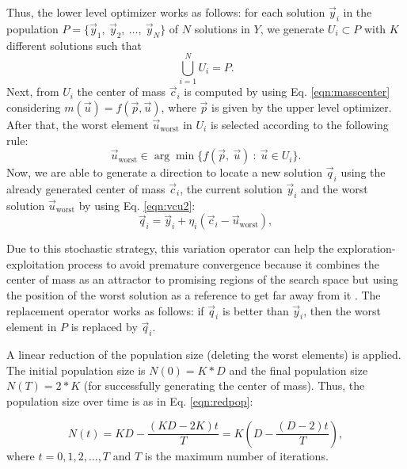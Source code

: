 \documentclass[conference]{IEEEtran}
\begin{document}
Thus, the lower level optimizer works as follows: for each solution $\vec{y}_i $
in the population $P = \{ \vec{y}_1,\ \vec{y}_2, \ \ldots, \ \vec{y}_{N} \} $
of $N$  solutions in $Y$, we generate $U_i \subset P $ with $K$ different
solutions such that
% 
$$
\bigcup_{i=1}^N U_i = P.
$$
%
Next, from $U_i$ the center of mass $\vec{c}_i$ is computed by using Eq. \ref{eqn:masscenter}
considering $m(\vec{u}) = f(\vec{p}, \vec{u})$, where $\vec{p}$ is given by the
upper level optimizer. After that, the worst element $\vec{u}_{\text{worst}}$
in $U_i$ is selected according to the following rule:
% 
$$
    \vec{u}_{\text{worst}} \in \arg \min \{f(\vec{p}, \ \vec{u} ) 
    \ : \
    \vec{u} \in U_i \}.
$$
% 
Now, we are able to generate a direction to locate a new solution $ \vec{q}_i$
using the already generated center of mass $\vec{c}_i$, the current solution
$\vec{y}_i$ and the worst solution $\vec{u}_{\text{worst}}$ by using Eq. \ref{eqn:vcu2}:
% 
\begin{equation}
    \vec{q}_i = \vec{y}_i + \eta _{i} ( \vec{c}_i - \vec{u}_{ \text{worst} } ) ,
    \label{eqn:vcu2}
\end{equation}
% 

Due to this stochastic strategy, this variation operator can help the exploration-exploitation 
process to avoid premature convergence because it combines the center of mass as
an attractor to promising regions of the search space but using the position of
the worst solution as a reference to get far away from it \cite{Mejia2018}. The
replacement operator works as follows: if $\vec{q}_i$ is better than $\vec{y}_i$,
then the worst element in $P$ is replaced by $\vec{q}_i$.


A linear reduction of the population size (deleting the worst elements) is applied.
The initial population size is $ N(0) = K*D$ and the final population size $N(T) =  2*K$
(for successfully generating the center of mass). Thus, the population size over
time is as in Eq. \ref{eqn:redpop}:

\begin{equation}
    N(t) = KD - \dfrac{(KD - 2K)  t}{T} 
    = K \left( D - \dfrac{(D - 2)  t}{T} \right),
\label{eqn:redpop}
\end{equation}
% 
where $t = 0,1,2,\ldots,T$ and $T$ is the maximum number of iterations.
\end{document}
